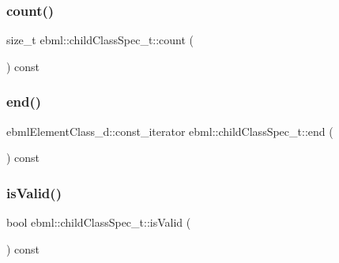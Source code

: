 \mbox{\label{classebml_1_1childClassSpec__t_af82cf4975b558a27b208b2f9fbb3d694}} 
\subsubsection{\texorpdfstring{count()}{count()}\hspace{0.1cm}{\footnotesize\ttfamily [2/2]}}
{\footnotesize\ttfamily size\+\_\+t ebml\+::child\+Class\+Spec\+\_\+t\+::count (\begin{DoxyParamCaption}\item[{const \mbox{\hyperlink{classebml_1_1ebmlElementClass}{ebml\+Element\+Class}} $\ast$}]{ }\end{DoxyParamCaption}) const}

\mbox{\label{classebml_1_1childClassSpec__t_ab2bdc87fcf5681a4018b21fb0887ef0e}} 
\subsubsection{\texorpdfstring{end()}{end()}}
{\footnotesize\ttfamily ebml\+Element\+Class\+\_\+d\+::const\+\_\+iterator ebml\+::child\+Class\+Spec\+\_\+t\+::end (\begin{DoxyParamCaption}{ }\end{DoxyParamCaption}) const}

\mbox{\label{classebml_1_1childClassSpec__t_adf50592c52a1b42f2162e975bf82ad27}} 
\subsubsection{\texorpdfstring{is\+Valid()}{isValid()}}
{\footnotesize\ttfamily bool ebml\+::child\+Class\+Spec\+\_\+t\+::is\+Valid (\begin{DoxyParamCaption}\item[{const \mbox{\hyperlink{namespaceebml_adad533b7705a16bb360fe56380c5e7be}{ebml\+Element\+\_\+sp}} \&}]{ }\end{DoxyParamCaption}) const}

